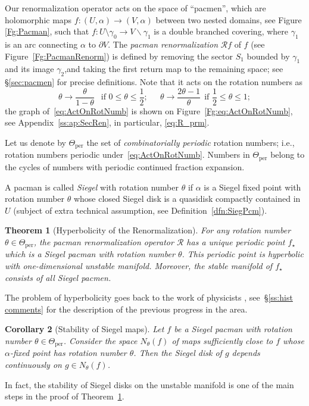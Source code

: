 \documentclass[]{amsart}
\renewcommand{\sp}{{\ \ }}
\newcommand\RR{\mathcal{R}}
\newcommand{\str}{{\star}}
\newtheorem{thm}{Theorem}[section]
\newtheorem{cor}[thm]{Corollary}
\theoremstyle{remark}
\numberwithin{equation}{section}
\theoremstyle{definition}
\newcommand{\per}{{\mathrm{per}}}
\newcommand{\di}{\partial}
\newcommand{\ra}{\rightarrow}
\def\sm{\smallsetminus}
\begin{document}
Our renormalization operator acts on the space of ``pacmen'', 
which are holomorphic  maps $f:  (U,\alpha) \ra (V,\alpha)$ between two nested  domains, see Figure \ref{Fg:Pacman},
such that  $f: U\setminus \gamma_0\ra V\sm \gamma_1$ is a double branched covering,
where $\gamma_1$ is  an arc connecting $\alpha$ to $\di V$. 
The {\em pacman renormalization} $\RR f$ of $f$ (see Figure~\ref{Fg:PacmanRenorm}) is defined by removing the sector $S_1$
 bounded by $\gamma_1$ and its image $\gamma_2$,and taking the first return map to the remaining space; see \S\ref{sec:pacmen} for precise definitions. Note that it acts on the rotation numbers as
\begin{equation}
\label{eq:ActOnRotNumb}
\theta\longrightarrow \frac{\theta}{1-\theta}\sp \mbox{ if }0\le \theta \le \frac{1}{2};\quad \sp \theta\longrightarrow\frac{2\theta-1}{\theta} \sp \mbox{if }\frac{1}{2}\le \theta\le 1; 
\end{equation}
the graph of~\eqref{eq:ActOnRotNumb} is shown on Figure~\ref{Fg:eq:ActOnRotNumb}, see Appendix~\ref{ss:ap:SecRen}, in particular, \eqref{eq:R_prm}.


Let us denote by $\Theta_\per$ the set of {\em  combinatorially periodic}
rotation numbers; i.e., rotation numbers periodic under~\eqref{eq:ActOnRotNumb}. Numbers in $\Theta_\per$ belong to the cycles of numbers with periodic continued fraction expansion.




A pacman is called {\em Siegel}  with rotation number $\theta$ if $\alpha$ is a 
Siegel fixed point with  rotation number $\theta$ whose closed Siegel disk is a quasidisk compactly contained in $U$ (subject of extra technical assumption, see Definition~\ref{dfn:SiegPcm}).

\begin{thm}[Hyperbolicity of the Renormalization] \label{renorm thm}
For any rotation number $\theta\in \Theta_\per$,  
the pacman renormalization operator $\RR$ has a unique periodic  point $f_\str$ which is a
Siegel pacman with rotation number $\theta$.    
This periodic point is hyperbolic with one-dimensional unstable manifold. 
Moreover, the stable manifold of $f_\str$ consists of all Siegel pacmen. 
\end{thm}
\noindent The problem of hyperbolicity goes back to the work of physicists \cites{Wi, MN,MP}, see~\S\ref{ss:hist comments} for the description of the previous progress in the area.

\begin{cor}[Stability of Siegel maps]
Let $f$ be a Siegel pacman with rotation number $\theta\in \Theta_\per$. Consider the space $N_\theta(f)$ of maps sufficiently close to $f$ whose $\alpha$-fixed point has rotation number $\theta$. Then the Siegel disk of $g$ depends continuously on $g\in N_\theta(f)$.
\end{cor}
\noindent In fact, the stability of Siegel disks on the unstable manifold is one of the main steps in the proof of Theorem~\ref{renorm thm}.
\end{document}
